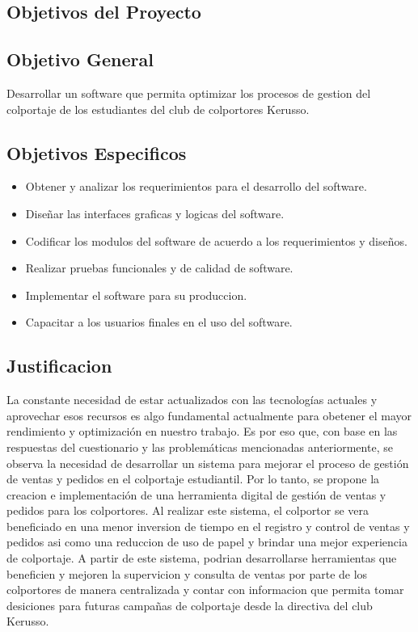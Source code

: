 \documentclass[runningheads]{llncs}
\begin{document}
\subsection{Objetivos del Proyecto}
\subsection*{Objetivo General}
Desarrollar un software que permita optimizar los procesos de gestion del colportaje de los estudiantes del club de colportores Kerusso.
\subsection*{Objetivos Especificos}
\begin{itemize}
    \item Obtener y analizar los requerimientos para el desarrollo del software.
    \item Diseñar las interfaces graficas y logicas del software.
    \item Codificar los modulos del software de acuerdo a los requerimientos y diseños.
    \item Realizar pruebas funcionales y de calidad de software.
    \item Implementar el software para su produccion.
    \item Capacitar a los usuarios finales en el uso del software.
\end{itemize}

\subsection{Justificacion}

La constante necesidad de estar actualizados con las tecnologías actuales y aprovechar esos recursos es algo fundamental actualmente para obetener el mayor rendimiento y optimización en nuestro trabajo. Es por eso que, con base en las respuestas del cuestionario y las problemáticas mencionadas anteriormente, se observa la necesidad de desarrollar un sistema para mejorar el proceso de gestión de ventas y pedidos en el colportaje estudiantil. Por lo tanto, se propone la creacion e implementación de una herramienta digital de gestión de ventas y pedidos para los colportores. Al realizar este sistema, el colportor se vera beneficiado en una menor inversion de tiempo en el registro y control de ventas y pedidos asi como una reduccion de uso de papel y brindar una mejor experiencia de colportaje. A partir de este sistema, podrian desarrollarse herramientas que beneficien y mejoren la supervicion y consulta de ventas por parte de los colportores de manera centralizada y contar con informacion que permita tomar desiciones para futuras campañas de colportaje desde la directiva del club Kerusso.
\end{document}
